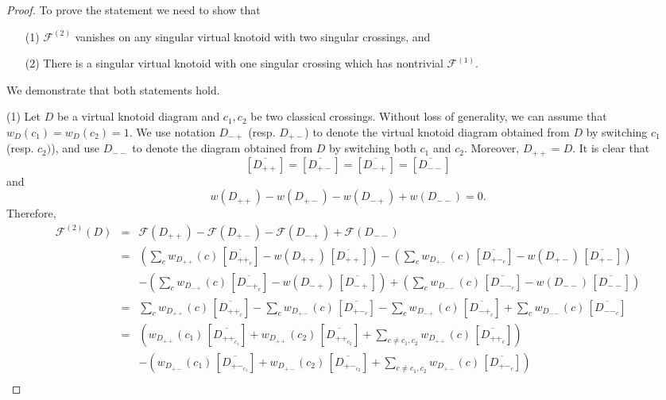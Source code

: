 \documentclass[11pt]{amsart}
\theoremstyle{noparens}
\numberwithin{equation}{section}
\numberwithin{equation}{section}
\begin{document}
\begin{proof}
To prove the statement we need to show that 
\begin{itemize}
\item[(1)] $\mathcal{F}^{(2)}$ vanishes on any singular virtual knotoid with two singular crossings, and 
\item[(2)] There is a singular virtual knotoid with one singular crossing which has nontrivial $\mathcal{F}^{(1)}$.
\end{itemize}	
	
We demonstrate that both statements hold.	
	
(1) Let $D$ be a virtual knotoid diagram and $c_1, c_2$ be two classical crossings. Without loss of generality, we can assume that $w_D(c_1) = w_D(c_2) = 1$. We use notation $D_{-+}$ (resp. $D_{+-}$) to denote the virtual knotoid diagram obtained from $D$ by switching $c_1$ (resp.  $c_2)$), and use $D_{--}$ to denote the diagram obtained from $D$ by switching both $c_1$ and $c_2$. Moreover, $D_{++}= D$.
It is clear that 
$$
[\overline{D_{++}}] = [\overline{D_{+-}}] = [\overline{D_{-+}}] = [\overline{D_{--}}]  
$$
and 
$$
w(D_{++})-w(D_{+-})-w(D_{-+})+w(D_{--})=0. 
$$
Therefore, 
\begin{eqnarray*}
\mathcal{F}^{(2)}(D)&=&\mathcal{F}(D_{++}) - \mathcal{F}(D_{+-}) - \mathcal{F}(D_{-+}) + \mathcal{F}(D_{--}) \\ 
&=& \left(\sum_c w_{D_{++}} (c) \, [\overline{D_{++_c}}] - w(D_{++}) \, [\overline{D_{++}}] \right) 
  - \left( \sum_c w_{D_{+-}} (c) \, [\overline{D_{+-_c}}] - w(D_{+-}) \, [\overline{D_{+-}}] \right) \\ 
& & -\left(\sum_c w_{D_{-+}}(c) \, [\overline{D_{-+_c}}] - w(D_{-+}) \, [\overline{D_{-+}}] \right)  
  +\left( \sum_c w_{D_{--}}(c) \, [\overline{D_{--_c}}] - w(D_{--}) \, [\overline{D_{--}}] \right) \\ 
&=& \sum_c  w_{D_{++}} (c) \, [\overline{D_{++_c}}] - \sum_c w_{D_{+-}} (c) \, [\overline{D_{+-_c}}]  
- \sum_c w_{D_{-+}}(c) \, [\overline{D_{-+_c}}] + \sum_c w_{D_{--}}(c) \, [\overline{D_{--_c}}] \\ 
&=& \left(  w_{D_{++}} (c_1) \, [\overline{D_{++_{c_1}}}] +  w_{D_{++}} (c_2) \, [\overline{D_{++_{c_2}}}] + \sum_{c\neq c_1,c_2 }w_{D_{++}} (c) \, [\overline{D_{++_{c}}}] \right)  \\
& & - \left(  w_{D_{+-}} (c_1) \, [\overline{D_{+-_{c_1}}}] +   w_{D_{+-}} (c_2) \, [\overline{D_{+-_{c_2}}}] + \sum_{c\neq c_1,c_2 }w_{D_{+-}} (c) \, [\overline{D_{+-_{c}}}]  \right) \\

\end{eqnarray*}
\end{proof}
\end{document}
